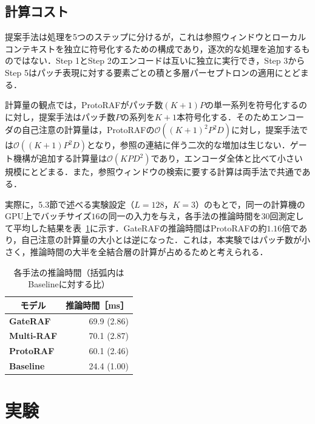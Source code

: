 \documentclass[twocolumn, lastpage]{jarticle}
\newif\ifrevmark
\newcommand{\revAblock}[1]{\ifrevmark{\color{blue}#1}\else#1\fi}
\newcommand{\revAcolor}{\ifrevmark\color{blue}\fi}
\begin{document}
\revAblock{\subsection{計算コスト}
提案手法は処理を5つのステップに分けるが，これは参照ウィンドウとローカルコンテキストを独立に符号化するための構成であり，逐次的な処理を追加するものではない．Step 1とStep 2のエンコードは互いに独立に実行でき，Step 3からStep 5はパッチ表現に対する要素ごとの積と多層パーセプトロンの適用にとどまる．

計算量の観点では，ProtoRAFがパッチ数$(K+1)P$の単一系列を符号化するのに対し，提案手法はパッチ数$P$の系列を$K+1$本符号化する．そのためエンコーダの自己注意の計算量は，ProtoRAFの$\mathcal{O}((K+1)^2P^2D)$に対し，提案手法では$\mathcal{O}((K+1)P^2D)$となり，参照の連結に伴う二次的な増加は生じない．ゲート機構が追加する計算量は$\mathcal{O}(KPD^2)$であり，エンコーダ全体と比べて小さい規模にとどまる．また，参照ウィンドウの検索に要する計算は両手法で共通である．

実際に，5.3節で述べる実験設定（$L=128$，$K=3$）のもとで，同一の計算機のGPU上でバッチサイズ$16$の同一の入力を与え，各手法の推論時間を$30$回測定して平均した結果を表~\ref{tab:inference_time}に示す．GateRAFの推論時間はProtoRAFの約$1.16$倍であり，自己注意の計算量の大小とは逆になった．これは，本実験ではパッチ数が小さく，推論時間の大半を全結合層の計算が占めるためと考えられる．}

    \begin{table}[t]
        \revAcolor
        \caption{各手法の推論時間（括弧内はBaselineに対する比）}
        \label{tab:inference_time}
        \centering
        \begin{tabular}{lr}
            \hline
            \multicolumn{1}{c}{モデル} & \multicolumn{1}{c}{推論時間［ms］} \\
            \hline\hline
            \textbf{GateRAF} & 69.9 (2.86) \\
            \textbf{Multi-RAF} & 70.1 (2.87) \\
            \textbf{ProtoRAF} & 60.1 (2.46) \\
            \textbf{Baseline} & 24.4 (1.00) \\
            \hline
        \end{tabular}
    \end{table}


\section{実験}
\end{document}
